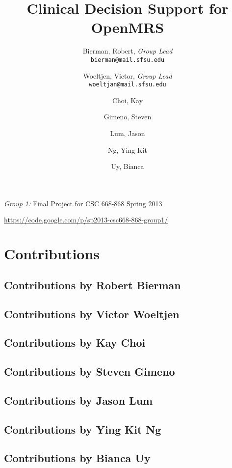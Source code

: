 \documentclass[12pt,letterpaper]{article}
\title{
  Clinical Decision Support for OpenMRS
}
\author{
        Bierman, Robert,  \emph{Group Lead}  \\ \texttt{bierman@mail.sfsu.edu} \and 
        Woeltjen, Victor, \emph{Group Lead}  \\ \texttt{woeltjan@mail.sfsu.edu} \and
        Choi, Kay       \and
        Gimeno, Steven  \and
        Lum, Jason      \and
        Ng, Ying Kit    \and
        Uy, Bianca      
}
\begin{document}
\newpage 

\maketitle
\begin{center}
\begin{Large}\emph{Group 1:} Final Project for CSC 668-868 Spring 2013\end{Large} \linebreak
\url{https://code.google.com/p/sp2013-csc668-868-group1/}
\end{center}
\thispagestyle{empty} %

\newpage {}
\tableofcontents


\newpage {}
\section{Contributions} 

\subsection{Contributions by Robert Bierman}

\subsection{Contributions by Victor Woeltjen}

\subsection{Contributions by Kay Choi}

\subsection{Contributions by Steven Gimeno}

\subsection{Contributions by Jason Lum}

\subsection{Contributions by Ying Kit Ng}

\subsection{Contributions by Bianca Uy}
\end{document}
